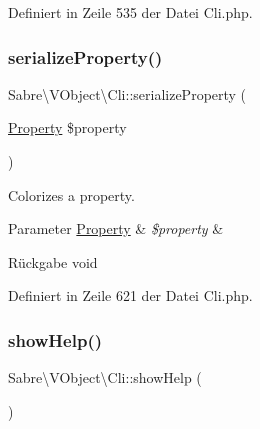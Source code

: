 Definiert in Zeile 535 der Datei Cli.\+php.

\mbox{\label{class_sabre_1_1_v_object_1_1_cli_adc5de6d5506735971011d05cca306aa6}} 
\subsubsection{\texorpdfstring{serialize\+Property()}{serializeProperty()}}
{\footnotesize\ttfamily Sabre\textbackslash{}\+V\+Object\textbackslash{}\+Cli\+::serialize\+Property (\begin{DoxyParamCaption}\item[{\mbox{\hyperlink{class_sabre_1_1_v_object_1_1_property}{Property}}}]{\$property }\end{DoxyParamCaption})\hspace{0.3cm}{\ttfamily [protected]}}

Colorizes a property.


\begin{DoxyParams}[1]{Parameter}
\mbox{\hyperlink{class_sabre_1_1_v_object_1_1_property}{Property}} & {\em \$property} & \\
\hline
\end{DoxyParams}
\begin{DoxyReturn}{Rückgabe}
void 
\end{DoxyReturn}


Definiert in Zeile 621 der Datei Cli.\+php.

\mbox{\label{class_sabre_1_1_v_object_1_1_cli_a15438a1d08a2880b8807fcafd9f1308f}} 
\subsubsection{\texorpdfstring{show\+Help()}{showHelp()}}
{\footnotesize\ttfamily Sabre\textbackslash{}\+V\+Object\textbackslash{}\+Cli\+::show\+Help (\begin{DoxyParamCaption}{ }\end{DoxyParamCaption})\hspace{0.3cm}{\ttfamily [protected]}}

